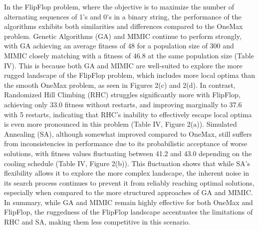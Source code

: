 In the FlipFlop problem, where the objective is to maximize the number of alternating sequences of 1’s and 0’s in a binary string, the performance of the algorithms exhibits both similarities and differences compared to the OneMax problem. Genetic Algorithms (GA) and MIMIC continue to perform strongly, with GA achieving an average fitness of 48 for a population size of 300 and MIMIC closely matching with a fitness of 46.8 at the same population size (Table IV). This is because both GA and MIMIC are well-suited to explore the more rugged landscape of the FlipFlop problem, which includes more local optima than the smooth OneMax problem, as seen in Figures 2(c) and 2(d). In contrast, Randomized Hill Climbing (RHC) struggles significantly more with FlipFlop, achieving only 33.0 fitness without restarts, and improving marginally to 37.6 with 5 restarts, indicating that RHC's inability to effectively escape local optima is even more pronounced in this problem (Table IV, Figure 2(a)). Simulated Annealing (SA), although somewhat improved compared to OneMax, still suffers from inconsistencies in performance due to its probabilistic acceptance of worse solutions, with fitness values fluctuating between 41.2 and 43.0 depending on the cooling schedule (Table IV, Figure 2(b)). This fluctuation shows that while SA’s flexibility allows it to explore the more complex landscape, the inherent noise in its search process continues to prevent it from reliably reaching optimal solutions, especially when compared to the more structured approaches of GA and MIMIC. In summary, while GA and MIMIC remain highly effective for both OneMax and FlipFlop, the ruggedness of the FlipFlop landscape accentuates the limitations of RHC and SA, making them less competitive in this scenario.
